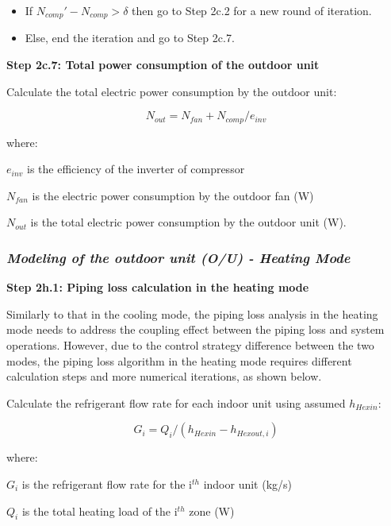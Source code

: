 \begin{itemize}
\item
  If \({N_{comp}}'-N_{comp}>\delta\) then go to Step 2c.2 for a new round of iteration.
\item
  Else, end the iteration and go to Step 2c.7.
\end{itemize}

\textbf{Step 2c.7: Total power consumption of the outdoor unit}\label{step-2c.7-total-power-consumption-of-the-outdoor-unit}

Calculate the total electric power consumption by the outdoor unit:

\begin{equation}
N_{out} = N_{fan}+N_{comp}/e_{inv}
\end{equation}

where:

\(e_{inv}\) is the efficiency of the inverter of compressor

\(N_{fan}\) is the electric power consumption by the outdoor fan (W)

\(N_{out}\) is the total electric power consumption by the outdoor unit (W).

\subsubsection{\emph{Modeling of the outdoor unit (O/U) - Heating Mode}}\label{modeling-of-the-outdoor-unit-ou---heating-mode}

\textbf{Step 2h.1: Piping loss calculation in the heating mode}

Similarly to that in the cooling mode, the piping loss analysis in the heating mode needs to address the coupling effect between the piping loss and system operations. However, due to the control strategy difference between the two modes, the piping loss algorithm in the heating mode requires different calculation steps and more numerical iterations, as shown below.

Calculate the refrigerant flow rate for each indoor unit using assumed \(h_{Hexin}\):

\begin{equation}
G_i = Q_i/(h_{Hexin}-h_{Hexout,i})
\end{equation}

where:

\(G_i\) is the refrigerant flow rate for the i\(^{th}\) indoor unit (kg/s)

\(Q_i\) is the total heating load of the i\(^{th}\) zone (W)

